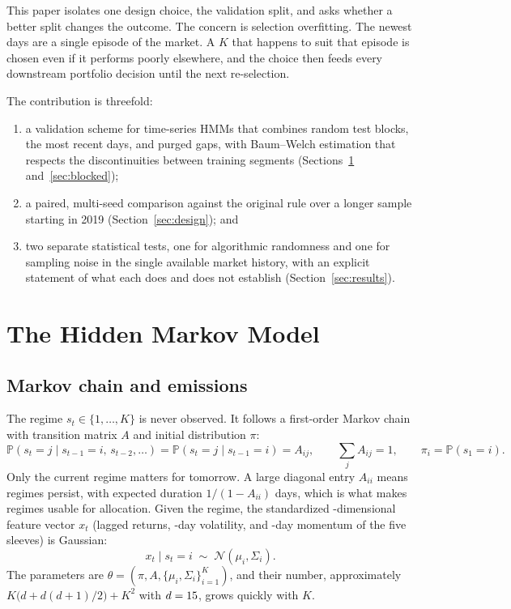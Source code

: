 \documentclass[11pt]{article}
\newcommand{\pr}{\mathbb{P}}
\begin{document}
This paper isolates one design choice, the validation split, and asks whether a better split changes the outcome. The concern is selection overfitting. The newest \ValidationDays{} days are a single episode of the market. A $K$ that happens to suit that episode is chosen even if it performs poorly elsewhere, and the choice then feeds every downstream portfolio decision until the next re-selection.

The contribution is threefold:
\begin{enumerate}
  \item a validation scheme for time-series HMMs that combines random test blocks, the most recent days, and purged gaps, with Baum--Welch estimation that respects the discontinuities between training segments (Sections~\ref{sec:hmm} and~\ref{sec:blocked});
  \item a paired, multi-seed comparison against the original rule over a longer sample starting in 2019 (Section~\ref{sec:design}); and
  \item two separate statistical tests, one for algorithmic randomness and one for sampling noise in the single available market history, with an explicit statement of what each does and does not establish (Section~\ref{sec:results}).
\end{enumerate}

\section{The Hidden Markov Model}\label{sec:hmm}

\subsection{Markov chain and emissions}

The regime $s_t\in\{1,\dots,K\}$ is never observed. It follows a first-order Markov chain with transition matrix $A$ and initial distribution $\pi$:
\begin{equation}
\pr(s_t=j\mid s_{t-1}=i,\,s_{t-2},\dots)=\pr(s_t=j\mid s_{t-1}=i)=A_{ij},\qquad \sum_{j}A_{ij}=1,\qquad \pi_i=\pr(s_1=i).
\end{equation}
Only the current regime matters for tomorrow. A large diagonal entry $A_{ii}$ means regimes persist, with expected duration $1/(1-A_{ii})$ days, which is what makes regimes usable for allocation. Given the regime, the standardized \FeatureDim{}-dimensional feature vector $x_t$ (lagged returns, \VolWindow{}-day volatility, and \MomWindow{}-day momentum of the five sleeves) is Gaussian:
\begin{equation}
x_t\mid s_t=i\;\sim\;\mathcal N(\mu_i,\Sigma_i).
\end{equation}
The parameters are $\theta=(\pi,A,\{\mu_i,\Sigma_i\}_{i=1}^{K})$, and their number, approximately $K\bigl(d+d(d+1)/2\bigr)+K^2$ with $d=15{}$, grows quickly with $K$.
\end{document}
